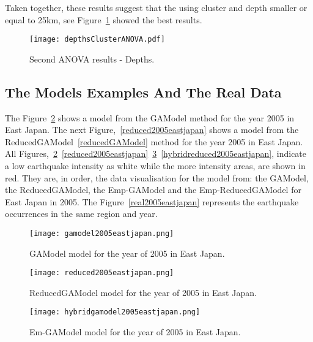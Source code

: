 Taken together, these results suggest that the using cluster and depth smaller or equal to 25km, see Figure~\ref{depthsClusterANOVA} showed the best results.\\

\begin{figure}[H]
	\centering
	\texttt{[image: depthsClusterANOVA.pdf]}
	\caption{Second ANOVA results - Depths.}
	\label{depthsClusterANOVA}
\end{figure}

\subsection{The Models Examples And The Real Data}

The Figure~\ref{gamodel2005eastjapan} shows a model from the GAModel method for the year 2005 in East Japan. The next Figure,~\ref{reduced2005eastjapan} shows a model from the ReducedGAModel~\ref{reducedGAModel} method for the year 2005 in East Japan.\\

All Figures,~\ref{gamodel2005eastjapan}~\ref{reduced2005eastjapan}~\ref{hybridgamodel2005eastjapan}~\ref{hybridreduced2005eastjapan},  indicate a low earthquake intensity as white while the more intensity areas, are shown in red. They are, in order, the data visualisation for the model from: the GAModel, the ReducedGAModel, the Emp-GAModel and the Emp-ReducedGAModel for East Japan in 2005. The Figure~\ref{real2005eastjapan} represents the earthquake occurrences in the same region and year.\\


\begin{figure}[H]
	\centering
	\begin{minipage}{0.45\textwidth}
		\centering
		\texttt{[image: gamodel2005eastjapan.png]}
		\caption{GAModel model for the year of 2005 in East Japan.}
		\label{gamodel2005eastjapan}
	\end{minipage}
	\begin{minipage}{0.45\textwidth}

	\end{minipage}
\end{figure}


\begin{figure}[H]
	\centering
	\begin{minipage}{0.45\textwidth}
		\centering
		\texttt{[image: reduced2005eastjapan.png]}
		\caption{ReducedGAModel model for the year of 2005 in East Japan.}
		\label{reduced2005eastjapan}
	\end{minipage}
	\begin{minipage}{0.45\textwidth}
		\centering
		\texttt{[image: hybridgamodel2005eastjapan.png]}
		\caption{Em-GAModel model for the year of 2005 in East Japan.}
		\label{hybridgamodel2005eastjapan}
	\end{minipage}
\end{figure}

